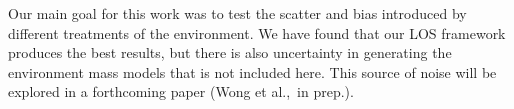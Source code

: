 Our main goal for this work was to test the scatter and bias introduced by different treatments of the environment. We have found that our LOS framework produces the best results, but there is also uncertainty in generating the environment mass models that is not included here. This source of noise will be explored in a forthcoming paper (Wong et al.,~in prep.).
